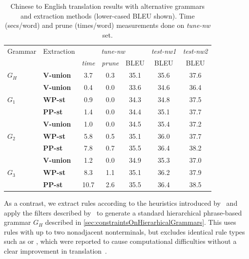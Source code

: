 \begin{table}
  \begin{center}
    \begin{tabular}{|l|l||c|c|c||c||c|}
      \hline
      Grammar & Extraction & \multicolumn{3}{c||}{{\em tune-nw}} & {\em test-nw1} & {\em test-nw2} \\  \cline{3-7}
      &            & {\em time} & {\em prune} & BLEU & BLEU & BLEU \\ \hline
      $G_H$ & {\bf V-union} & 3.7 & 0.3 & 35.1 & 35.6 & 37.6  \\
      \hline
      & {\bf V-union} & 0.4 & 0.0 & 33.6 & 34.6 & 36.4  \\
      $G_1$ & {\bf WP-st} & 0.9 & 0.0  & 34.3 & 34.8 & 37.5  \\
      & {\bf PP-st} & 1.4 & 0.0 & 34.4 & 35.1 & 37.7   \\
      \hline
      & {\bf V-union} & 1.0 & 0.0 & 34.5  & 35.4  & 37.2   \\
      $G_2$ & {\bf WP-st} & 5.8 & 0.5 & 35.1 & 36.0  & 37.7   \\
      & {\bf PP-st} & 7.8 & 0.7 & 35.5 & 36.4  & 38.2   \\
      \hline
      & {\bf V-union} & 1.2 & 0.0 & 34.9 & 35.3  & 37.0   \\
      $G_3$ & {\bf WP-st} & 8.3 & 1.1 & 35.1  & 36.2  & 37.9   \\
      & {\bf PP-st} & 10.7 &  2.6  & 35.5 & 36.4  & 38.5  \\
      \hline
    \end{tabular}
    \caption{Chinese to English translation results with alternative grammars and extraction methods (lower-cased BLEU shown). Time (secs/word) and prune (times/word) measurements done on {\em tune-nw} set.}
    \label{tab:extractionFromPosteriorsTranslationResults}
  \end{center}
\end{table}
%
As a contrast, we extract rules according to the heuristics introduced
by~\citet{chiang:2007:CL} and apply the filters described
by~\citet{iglesias-degispert-banga-byrne:2009:EACL} to generate a standard
hierarchical phrase-based grammar $G_H$ described in
\autoref{sec:constraintsOnHierarhicalGrammars}.
This uses rules with up to two nonadjacent
nonterminals, but excludes identical rule types such as \RT[$X$][$w~X$][$w~X$]
or \RT[$X$][$w~X_1~w~X_2$][$w~X_1~w~X_2$], which were reported to cause
computational difficulties without a clear improvement in
translation~\citep{iglesias-degispert-banga-byrne:2009:EACL}. 

